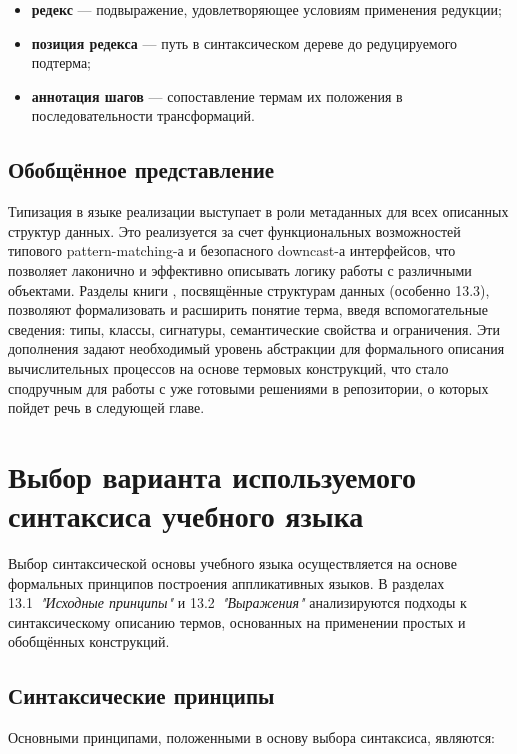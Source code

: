 \begin{itemize}
  \item \textbf{редекс} — подвыражение, удовлетворяющее условиям применения редукции;
  \item \textbf{позиция редекса} — путь в синтаксическом дереве до редуцируемого подтерма;
  \item \textbf{аннотация шагов} — сопоставление термам их положения в последовательности трансформаций.
\end{itemize}

\subsection*{Обобщённое представление}

Типизация в языке реализации выступает в роли метаданных для всех описанных структур данных. Это реализуется за счет функциональных возможностей типового pattern-matching-а и безопасного downcast-а интерфейсов, что позволяет лаконично и эффективно описывать логику работы с различными объектами.
Разделы книги \cite{Wolfengagen2004}, посвящённые структурам данных (особенно 13.3), позволяют формализовать и расширить понятие терма, введя вспомогательные сведения: типы, классы, сигнатуры, семантические свойства и ограничения. Эти дополнения задают необходимый уровень абстракции для формального описания вычислительных процессов на основе термовых конструкций, что стало сподручным для работы с уже готовыми решениями в репозитории, о которых пойдет речь в следующей главе.
\section{Выбор варианта используемого синтаксиса учебного языка}
\label{sec:syntax-choice}

Выбор синтаксической основы учебного языка осуществляется на основе формальных принципов построения аппликативных языков\cite{Wolfengagen2004}. В разделах 13.1~\textit{"Исходные принципы"} и 13.2~\textit{"Выражения"} анализируются подходы к синтаксическому описанию термов, основанных на применении простых и обобщённых конструкций.

\subsection*{Синтаксические принципы}

Основными принципами, положенными в основу выбора синтаксиса, являются:

